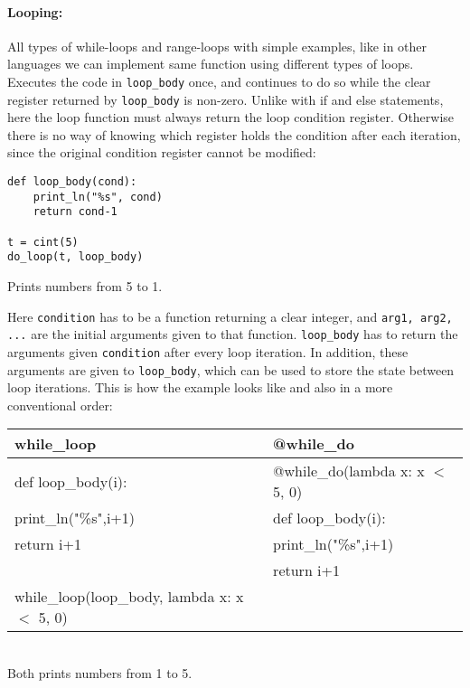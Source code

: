 \paragraph{Looping:}
All types of while-loops and range-loops with simple examples, like in other languages we can implement same function using different types of loops.
Executes the code in \verb|loop_body| once, and continues to do so while the clear register returned by \verb|loop_body| is non-zero. Unlike with if and else statements, here the loop function must always return the loop condition register. Otherwise there is no way of knowing which register holds the condition after each iteration, since the original condition register cannot be modified: 
\begin{lstlisting}
def loop_body(cond):
    print_ln("%s", cond)
    return cond-1

t = cint(5)
do_loop(t, loop_body)
\end{lstlisting}
\begin{footnotesize}
Prints numbers from 5 to 1.
\end{footnotesize}

Here \verb+condition+ has to be a function returning a clear integer, and \verb+arg1, arg2, ...+ are the initial arguments given to that
function. \verb+loop_body+ has to return the arguments given \verb+condition+ after every loop iteration. In addition, these arguments are given to \verb+loop_body+, which can be used to store the state between loop iterations. This is how the example looks like and also in a more conventional order:

\begin{center}
\begin{tabular}{|l|l|} \hline
\textbf{while_loop}                         & \textbf{@while_do}                \\ \hline
def loop_body(i):                           & @while_do(lambda x: x $<$ 5, 0)  \\
\hspace{5 mm}print_ln("\%s",i+1)            & def loop_body(i):                \\
\hspace{5 mm}return i+1                     & \hspace{5 mm}print_ln("\%s",i+1) \\
                                            & \hspace{5 mm}return i+1          \\
while_loop(loop_body, lambda x: x $<$ 5, 0) &                                  \\ \hline
\end{tabular}
\begin{footnotesize}
\\ Both prints numbers from 1 to 5.
\end{footnotesize}
\end{center}

